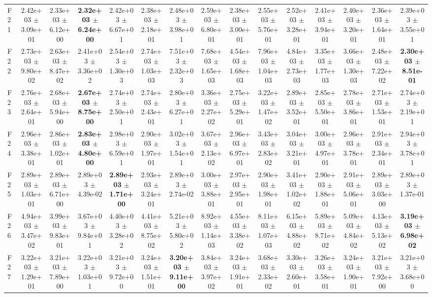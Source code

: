 \begin{table}
{\begin{tabular}{lcccccccccccccc}
F21 & 2.42e+03 $\pm$ 3.09e+01 & 2.33e+03 $\pm$ 6.12e+00 & \textbf{2.32e+03 $\pm$ 6.24e+00} & 2.42e+03 $\pm$ 6.67e+01 & 2.38e+03 $\pm$ 2.18e+01 & 2.48e+03 $\pm$ 3.98e+01 & 2.59e+03 $\pm$ 6.80e+01 & 2.38e+03 $\pm$ 3.00e+01 & 2.55e+03 $\pm$ 5.76e+01 & 2.52e+03 $\pm$ 3.28e+01 & 2.41e+03 $\pm$ 3.94e+01 & 2.40e+03 $\pm$ 3.20e+01 & 2.36e+03 $\pm$ 1.64e+01 & 2.39e+03 $\pm$ 3.55e+01 \\
F22 & 2.73e+03 $\pm$ 9.80e+02 & 2.63e+03 $\pm$ 8.47e+02 & 2.41e+03 $\pm$ 3.36e+02 & 2.54e+03 $\pm$ 1.30e+03 & 2.74e+03 $\pm$ 1.03e+03 & 7.51e+03 $\pm$ 2.32e+03 & 7.68e+03 $\pm$ 1.65e+03 & 4.54e+03 $\pm$ 1.68e+03 & 7.96e+03 $\pm$ 1.04e+03 & 4.84e+03 $\pm$ 2.73e+03 & 3.35e+03 $\pm$ 1.77e+03 & 3.66e+03 $\pm$ 1.30e+03 & 2.48e+03 $\pm$ 7.22e+02 & \textbf{2.30e+03 $\pm$ 8.51e-01} \\
F23 & 2.76e+03 $\pm$ 2.64e+01 & 2.68e+03 $\pm$ 5.94e+00 & \textbf{2.67e+03 $\pm$ 8.75e+00} & 2.74e+03 $\pm$ 2.50e+01 & 2.74e+03 $\pm$ 2.43e+01 & 2.80e+03 $\pm$ 6.27e+01 & 3.36e+03 $\pm$ 2.27e+02 & 2.75e+03 $\pm$ 5.29e+01 & 3.22e+03 $\pm$ 1.47e+02 & 2.89e+03 $\pm$ 3.52e+01 & 2.85e+03 $\pm$ 5.50e+01 & 2.78e+03 $\pm$ 3.86e+01 & 2.71e+03 $\pm$ 1.53e+01 & 2.74e+03 $\pm$ 2.19e+01 \\
F24 & 2.96e+03 $\pm$ 3.38e+01 & 2.86e+03 $\pm$ 1.02e+01 & \textbf{2.83e+03 $\pm$ 4.80e+00} & 2.98e+03 $\pm$ 6.59e+01 & 2.90e+03 $\pm$ 1.97e+01 & 3.02e+03 $\pm$ 1.54e+01 & 3.67e+03 $\pm$ 2.13e+02 & 2.96e+03 $\pm$ 6.97e+01 & 3.43e+03 $\pm$ 2.83e+02 & 3.04e+03 $\pm$ 3.21e+01 & 3.00e+03 $\pm$ 4.97e+01 & 2.96e+03 $\pm$ 3.78e+01 & 2.91e+03 $\pm$ 2.34e+01 & 2.94e+03 $\pm$ 3.78e+01 \\
F25 & 2.89e+03 $\pm$ 1.03e+01 & 2.89e+03 $\pm$ 6.71e+00 & 2.89e+03 $\pm$ 4.39e-02 & \textbf{2.89e+03 $\pm$ 1.71e+00} & 2.93e+03 $\pm$ 3.24e+01 & 2.89e+03 $\pm$ 2.74e-02 & 3.00e+03 $\pm$ 3.88e+01 & 2.97e+03 $\pm$ 2.95e+01 & 2.90e+03 $\pm$ 1.98e+01 & 3.41e+03 $\pm$ 1.02e+02 & 2.90e+03 $\pm$ 1.88e+01 & 2.91e+03 $\pm$ 5.06e+01 & 2.89e+03 $\pm$ 3.03e+00 & 2.89e+03 $\pm$ 1.37e-01 \\
F26 & 4.94e+03 $\pm$ 3.47e+02 & 3.99e+03 $\pm$ 9.83e+01 & 3.67e+03 $\pm$ 9.84e+01 & 4.40e+03 $\pm$ 3.28e+02 & 4.41e+03 $\pm$ 8.75e+02 & 5.21e+03 $\pm$ 5.80e+02 & 8.92e+03 $\pm$ 1.14e+03 & 4.55e+03 $\pm$ 3.38e+02 & 8.11e+03 $\pm$ 1.07e+03 & 6.15e+03 $\pm$ 4.88e+02 & 5.89e+03 $\pm$ 8.71e+02 & 5.09e+03 $\pm$ 4.84e+02 & 4.13e+03 $\pm$ 5.13e+02 & \textbf{3.19e+03 $\pm$ 6.98e+02} \\
F27 & 3.22e+03 $\pm$ 1.29e+01 & 3.21e+03 $\pm$ 7.89e+00 & 3.22e+03 $\pm$ 1.03e+01 & 3.21e+03 $\pm$ 9.72e+00 & 3.24e+03 $\pm$ 1.51e+01 & \textbf{3.20e+03 $\pm$ 9.11e+00} & 3.84e+03 $\pm$ 3.97e+02 & 3.24e+03 $\pm$ 1.91e+01 & 3.68e+03 $\pm$ 2.33e+02 & 3.30e+03 $\pm$ 2.60e+01 & 3.26e+03 $\pm$ 3.58e+01 & 3.24e+03 $\pm$ 1.90e+01 & 3.21e+03 $\pm$ 7.92e+00 & 3.21e+03 $\pm$ 3.68e+00 \\

\end{tabular}}
\end{table}
